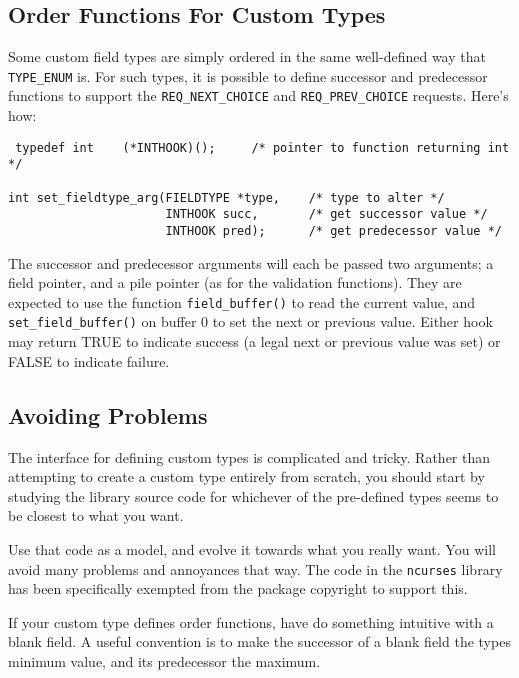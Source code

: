 \subsection{Order Functions For Custom Types}

\label{f0:fcustorder}Some custom field types are simply ordered in the same well-defined way
that \texttt{TYPE\_ENUM} is.  For such types, it is possible to define
successor and predecessor functions to support the \texttt{REQ\_NEXT\_CHOICE}
and \texttt{REQ\_PREV\_CHOICE} requests. Here's how:
\begin{verbatim} typedef int	(*INTHOOK)();     /* pointer to function returning int */

int set_fieldtype_arg(FIELDTYPE *type,    /* type to alter */
                      INTHOOK succ,       /* get successor value */
                      INTHOOK pred);      /* get predecessor value */
\end{verbatim}
The successor and predecessor arguments will each be passed two arguments;
a field pointer, and a pile pointer (as for the validation functions).  They
are expected to use the function \texttt{field\_buffer()} to read the
current value, and \texttt{set\_field\_buffer()} on buffer 0 to set the next
or previous value.  Either hook may return TRUE to indicate success (a
legal next or previous value was set) or FALSE to indicate failure.

\subsection{Avoiding Problems}

\label{f0:fcustprobs}The interface for defining custom types is complicated and tricky.
Rather than attempting to create a custom type entirely from scratch,
you should start by studying the library source code for whichever of
the pre-defined types seems to be closest to what you want. 

Use that code as a model, and evolve it towards what you really want.
You will avoid many problems and annoyances that way.  The code
in the \texttt{ncurses} library has been specifically exempted from
the package copyright to support this. 

If your custom type defines order functions, have do something intuitive
with a blank field.  A useful convention is to make the successor of a
blank field the types minimum value, and its predecessor the maximum.
